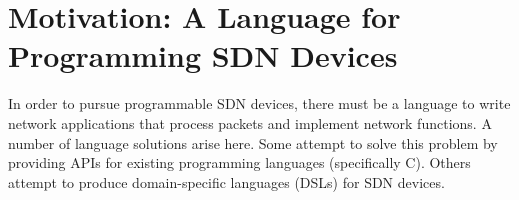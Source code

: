 %
%
%
%
%

\section{Motivation: A Language for Programming SDN Devices}

In order to pursue programmable SDN devices, there must be a language to write network applications that process packets and implement network functions. 
A number of language solutions arise here.
Some attempt to solve this problem by providing APIs for existing programming
languages (specifically C).
Others attempt to produce domain-specific languages (DSLs) for SDN devices.

